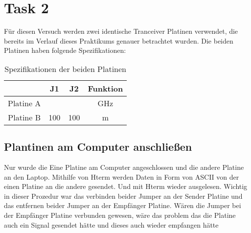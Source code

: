 \section{Task 2}
Für diesen Versuch werden zwei identische Tranceiver Platinen verwendet, die bereits im Verlauf dieses Praktikums genauer betrachtet wurden.
Die beiden Platinen haben folgende Spezifikationen:


\begin{table}[h!]
    \centering
    \begin{tabular}{|c|c|c|c|}
        \hline
         & J1 & J2 & Funktion \\
        \hline
        Platine A &  &  & GHz \\
        Platine B & 100 & 100 & m \\
        \hline
    \end{tabular}
    \caption{Spezifikationen der beiden Platinen}
\end{table}

\subsection{Plantinen am Computer anschließen}
Nur wurde die Eine Platine am Computer angeschlossen und die andere Platine an den Laptop.
Mithilfe von Hterm werden Daten in Form von ASCII von der einen Platine an die andere gesendet.
Und mit Hterm wieder ausgelesen.
Wichtig in dieser Prozedur war das verbinden beider Jumper an der Sender Platine und das entfernen beider
Jumper an der Empfänger Platine. 
Wären die Jumper bei der Empfänger Platine verbunden gewesen, wäre das problem das die Platine auch 
ein Signal gesendet hätte und dieses auch wieder empfangen hätte